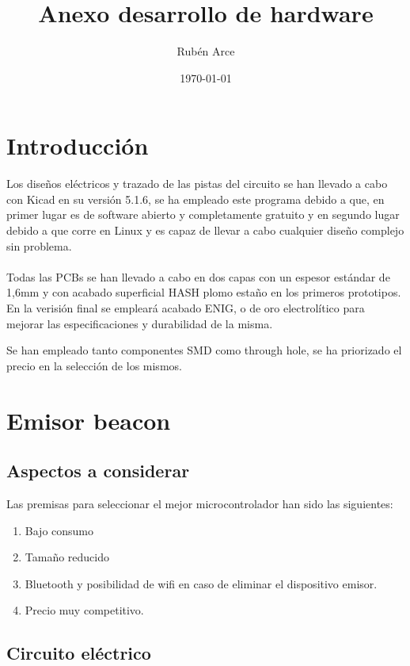 \documentclass[a4paper ,12pt, onecolumn]{article}
\begin{document}
\title{Anexo desarrollo de hardware}

\author{Rubén Arce}
\date{\today}
\maketitle
\cleardoublepage
\tableofcontents
\listoffigures
\cleardoublepage

\section{Introducción}
    Los diseños eléctricos y trazado de las pistas del circuito se han llevado a cabo con Kicad en 
    su versión 5.1.6, se ha empleado este programa debido a que, en primer lugar es de software abierto y
    completamente gratuito y en segundo lugar debido a que corre en Linux y es capaz de llevar a cabo 
    cualquier diseño complejo sin problema.
    \paragraph{}
    Todas las PCBs se han llevado a cabo en dos capas con un espesor estándar de 1,6mm y con acabado superficial
    HASH plomo estaño en los primeros prototipos. En la verisión final se empleará acabado ENIG, o de oro 
    electrolítico para mejorar las especificaciones y durabilidad de la misma.

    Se han empleado tanto componentes SMD como through hole, se ha priorizado el precio en la selección de los mismos.
\section{Emisor beacon}
    \subsection{Aspectos a considerar}
        Las premisas para seleccionar el mejor microcontrolador han sido las siguientes: 
        \begin{enumerate}
            \item Bajo consumo
            \item Tamaño reducido
            \item Bluetooth y posibilidad de wifi en caso de eliminar el dispositivo emisor.
            \item Precio muy competitivo.
        \end{enumerate}
    \subsection{Circuito eléctrico}
\end{document}
